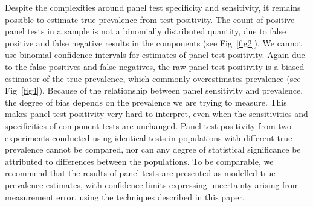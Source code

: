 \documentclass[10pt,letterpaper]{article}
\begin{document}
Despite the complexities around panel test specificity and sensitivity, it remains possible to estimate true prevalence from test positivity. The count of positive panel tests in a sample is not a binomially distributed quantity, due to false positive and false negative results in the components (see Fig~\ref{fig2}). We cannot use binomial confidence intervals for estimates of panel test positivity. Again due to the false positives and false negatives, the raw panel test positivity is a biased estimator of the true prevalence, which commonly overestimates prevalence (see Fig~\ref{fig4}). Because of the relationship between panel sensitivity and prevalence, the degree of bias depends on the prevalence we are trying to measure. This makes panel test positivity very hard to interpret, even when the sensitivities and specificities of component tests are unchanged. Panel test positivity from two experiments conducted using identical tests in populations with different true prevalence cannot be compared, nor can any degree of statistical significance be attributed to differences between the populations. To be comparable, we recommend that the results of panel tests are presented as modelled true prevalence estimates, with confidence limits expressing uncertainty arising from measurement error, using the techniques described in this paper.
\end{document}
